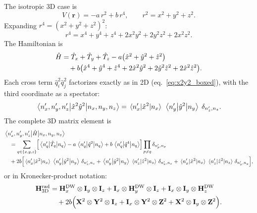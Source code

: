 The isotropic 3D case is
\begin{equation}\label{eq:V_radial_3d}
    V(\mathbf{r}) = -a\,r^2 + b\,r^4,
    \qquad r^2 = x^2 + y^2 + z^2.
\end{equation}
Expanding $r^4 = (x^2+y^2+z^2)^2$:
\begin{equation}\label{eq:r4_expand}
    r^4 = x^4 + y^4 + z^4 + 2x^2 y^2 + 2y^2 z^2 + 2x^2 z^2.
\end{equation}
The Hamiltonian is
\begin{align}\label{eq:H_3d_radial}
    \hat{H} &= \hat{T}_x + \hat{T}_y + \hat{T}_z
    - a\bigl(\hat{x}^2 + \hat{y}^2 + \hat{z}^2\bigr) \notag\\
    &\quad+ b\bigl(\hat{x}^4 + \hat{y}^4 + \hat{z}^4
    + 2\hat{x}^2\hat{y}^2 + 2\hat{y}^2\hat{z}^2 + 2\hat{x}^2\hat{z}^2\bigr).
\end{align}
Each cross term $\hat{q}_i^2\hat{q}_j^2$ factorizes exactly as in 2D
(eq.~\eqref{eq:x2y2_boxed}), with the third coordinate as a spectator:
\begin{equation}\label{eq:cross_3d}
    \mel{n'_x,n'_y,n'_z}{\hat{x}^2\hat{y}^2}{n_x,n_y,n_z}
    = \mel{n'_x}{\hat{x}^2}{n_x}\;\mel{n'_y}{\hat{y}^2}{n_y}\;
    \delta_{n'_z,n_z}.
\end{equation}
The complete 3D matrix element is
\begin{align}\label{eq:H_3d_mel}
    &\mel{n'_x,n'_y,n'_z}{\hat{H}}{n_x,n_y,n_z} \notag\\
    &\quad= \sum_{q\in\{x,y,z\}}\Bigl[
        \mel{n'_q}{\hat{T}_q}{n_q} - a\,\mel{n'_q}{\hat{q}^2}{n_q}
        + b\,\mel{n'_q}{\hat{q}^4}{n_q}\Bigr]
        \prod_{p\neq q}\delta_{n'_p,n_p}
    \notag\\
    &\quad+ 2b\Bigl[
        \mel{n'_x}{\hat{x}^2}{n_x}\,\mel{n'_y}{\hat{y}^2}{n_y}\,\delta_{n'_z,n_z}
        + \mel{n'_y}{\hat{y}^2}{n_y}\,\mel{n'_z}{\hat{z}^2}{n_z}\,\delta_{n'_x,n_x}
        + \mel{n'_x}{\hat{x}^2}{n_x}\,\mel{n'_z}{\hat{z}^2}{n_z}\,\delta_{n'_y,n_y}
    \Bigr],
\end{align}
or in Kronecker-product notation:
\begin{align}\label{eq:H_3d_kron}
    \mathbf{H}_\mathrm{3D}^\mathrm{rad}
    &= \mathbf{H}_x^\mathrm{DW}\otimes\mathbf{I}_y\otimes\mathbf{I}_z
    + \mathbf{I}_x\otimes\mathbf{H}_y^\mathrm{DW}\otimes\mathbf{I}_z
    + \mathbf{I}_x\otimes\mathbf{I}_y\otimes\mathbf{H}_z^\mathrm{DW}
    \notag\\
    &\quad+ 2b\Bigl(
        \mathbf{X}^2\otimes\mathbf{Y}^2\otimes\mathbf{I}_z
        + \mathbf{I}_x\otimes\mathbf{Y}^2\otimes\mathbf{Z}^2
        + \mathbf{X}^2\otimes\mathbf{I}_y\otimes\mathbf{Z}^2
    \Bigr).
\end{align}

